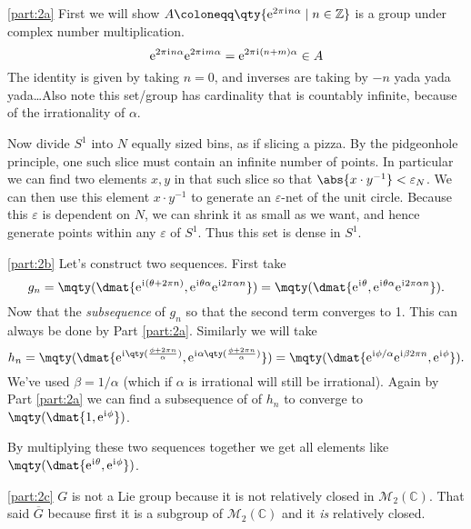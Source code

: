 \documentclass[pages,boxes,color=WildStrawberry]{homework}
\newcommand{\Z}{\mathbb{Z}}
\newcommand{\C}{\mathbb{C}}
\newcommand{\1}{\mathbb{1}}
\newcommand{\iu}{\mkern1mu\mathrm{i}\mkern1mu}
\newcommand{\e}{\mathrm{e}}
\newcommand{\mats}[2]{\mathcal{M}_{#1}(#2)}
\newcommand{\defeq}{\coloneqq}%
\begin{document}
\begin{solution}
	\ref{part:2a}
	First we will show $A\defeq\qty{\e^{2\pi\iu n\alpha}\mid n\in\Z}$ is a group under complex number multiplication.
	\begin{equation*}
		\e^{2\pi\iu n\alpha}\e^{2\pi\iu m\alpha} = \e^{2\pi\iu(n + m)\alpha}\in A
	\end{equation*}
	The identity is given by taking $n = 0$, and inverses are taking by $-n$ yada yada yada\dots Also note this set/group has cardinality that is countably infinite, because of the irrationality of $\alpha$.

	Now divide $S^1$ into $N$ equally sized bins, as if slicing a pizza. By the pidgeonhole principle, one such slice must contain an infinite number of points. In particular we can find two elements $x, y$ in that such slice so that $\abs{x\cdot y^{-1}}<\varepsilon_N$. We can then use this element $x\cdot y^{-1}$ to generate an $\varepsilon$-net of the unit circle. Because this $\varepsilon$ is dependent on $N$, we can shrink it as small as we want, and hence generate points within any $\varepsilon$ of $S^1$. Thus this set is dense in $S^1$.

	\ref{part:2b}
	Let's construct two sequences. First take
	\begin{equation*}
		g_n = \mqty(\dmat{\e^{\iu(\theta + 2\pi n)}, \e^{\iu\theta\alpha}\e^{\iu 2\pi\alpha n}}) = \mqty(\dmat{\e^{\iu \theta}, \e^{\iu\theta\alpha}\e^{\iu 2\pi\alpha n}}).
	\end{equation*}
	Now that the \emph{subsequence} of $g_n$ so that the second term converges to 1. This can always be done by Part \ref{part:2a}. Similarly we will take
	\begin{equation*}
		h_n = \mqty(\dmat{\e^{\iu\qty(\frac{\phi + 2\pi n}{\alpha})}, \e^{\iu\alpha\qty(\frac{\phi + 2\pi n}{\alpha})}}) = \mqty(\dmat{\e^{\iu\phi/\alpha}\e^{\iu\beta 2\pi n}, \e^{\iu \phi}}).
	\end{equation*}
	We've used $\beta = 1/\alpha$ (which if $\alpha$ is irrational will still be irrational). Again by Part \ref{part:2a} we can find a subsequence of of $h_n$ to converge to $\mqty(\dmat{1, \e^{\iu\phi}})$.

	By multiplying these two sequences together we get all elements like $\mqty(\dmat{\e^{\iu\theta}, \e^{\iu\phi}})$.

	\ref{part:2c}
	$G$ is not a Lie group because it is not relatively closed in $\mats{2}{\C}$. That said $\overline{G}$ because first it is a subgroup of $\mats{2}{\C}$ and it \emph{is} relatively closed.
\end{solution}
\end{document}
